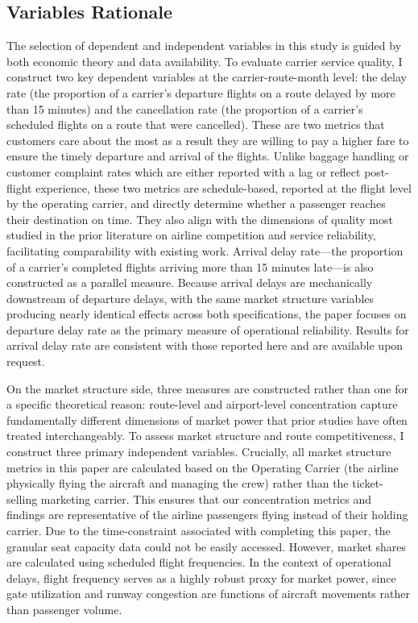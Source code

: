 \documentclass[preprint,12pt,authoryear]{elsarticle}
\begin{document}
\subsection{Variables Rationale}

The selection of dependent and independent variables in this study is guided by both economic theory and data availability. To evaluate carrier service quality, I construct two key dependent variables at the carrier-route-month level: the delay rate (the proportion of a carrier's departure flights on a route delayed by more than 15 minutes) and the cancellation rate (the proportion of a carrier's scheduled flights on a route that were cancelled). These are two metrics that customers care about the most as a result they are willing to pay a higher fare to ensure the timely departure and arrival of the flights.  Unlike baggage handling or customer complaint rates which are either reported with a lag or reflect post-flight experience, these two metrics are schedule-based, reported at the flight level by the operating carrier, and directly determine whether a passenger reaches their destination on time. They also align with the dimensions of quality most studied in the prior literature on airline competition and service reliability, facilitating comparability with existing work. Arrival delay rate---the proportion of a carrier's completed flights arriving more than 15 minutes late---is also constructed as a parallel measure. Because arrival delays are mechanically downstream of departure delays, with the same market structure variables producing nearly identical effects across both specifications, the paper focuses on departure delay rate as the primary measure of operational reliability. Results for arrival delay rate are consistent with those reported here and are available upon request.

On the market structure side, three measures are constructed rather than one for a specific theoretical reason: route-level and airport-level concentration capture fundamentally different dimensions of market power that prior studies have often treated interchangeably. To assess market structure and route competitiveness, I construct three primary independent variables. Crucially, all market structure metrics in this paper are calculated based on the Operating Carrier (the airline physically flying the aircraft and managing the crew) rather than the ticket-selling marketing carrier. This ensures that our concentration metrics and findings are representative of the airline passengers flying instead of their holding carrier. Due to the time-constraint associated with completing this paper, the granular seat capacity data could not be easily accessed. However, market shares are calculated using scheduled flight frequencies. In the context of operational delays, flight frequency serves as a highly robust proxy for market power, since gate utilization and runway congestion are functions of aircraft movements rather than passenger volume. 
\end{document}
